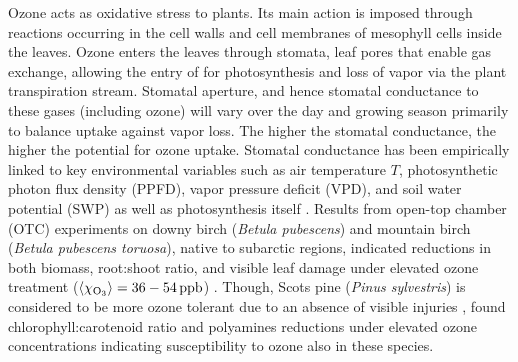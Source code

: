\documentclass[bg, manuscript]{copernicus}
\begin{document}
Ozone acts as oxidative stress to plants. Its main action is imposed through reactions occurring in the cell walls and cell membranes of mesophyll cells inside the leaves. Ozone enters the leaves through stomata, leaf pores that enable gas exchange, allowing the entry of  for photosynthesis and loss of  vapor via the plant transpiration stream. Stomatal aperture, and hence stomatal conductance to these gases (including ozone) will vary over the day and growing season primarily to balance  uptake against  vapor loss. The higher the stomatal conductance, the higher the potential for ozone uptake. Stomatal conductance has been empirically linked to key environmental variables such as air temperature $T$, photosynthetic photon flux density (PPFD), vapor pressure deficit (VPD), and soil water potential (SWP) as well as photosynthesis itself \citep[e.g.,][]{PTRS:Jarvis1976, BallBerry1987, Emberson2000, ICP:MappingManual2017}. Results from open-top chamber (OTC) experiments on downy birch (\emph{Betula pubescens}) and mountain birch (\emph{Betula pubescens toruosa}), native to subarctic regions, indicated reductions in both biomass, root:shoot ratio, and visible leaf damage under elevated ozone treatment ($\left<\chem{\chi_{O_3}}\right> = 36-54\,\unit{ppb}$) \citep{Amb:Manninen2009}. Though, Scots pine (\emph{Pinus sylvestris}) is considered to be more ozone tolerant due to an absence of visible injuries \citep{Amb:Girgzdiene2009}, \citet{Amb:Manninen2009} found chlorophyll:carotenoid ratio and polyamines reductions under elevated ozone concentrations indicating susceptibility to ozone also in these species.
\end{document}
